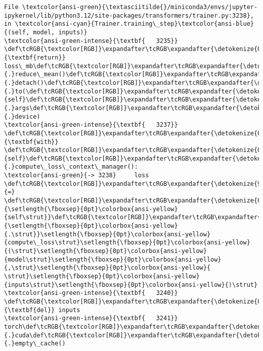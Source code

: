 \documentclass[11pt]{article}
\begin{document}
\begin{Verbatim}[commandchars=\\\{\}, frame=single, framerule=2mm, rulecolor=\color{outerrorbackground}]
File \textcolor{ansi-green}{\textasciitilde{}/miniconda3/envs/jupyter-ipykernel/lib/python3.12/site-packages/transformers/trainer.py:3238}, in \textcolor{ansi-cyan}{Trainer.training\_step}\textcolor{ansi-blue}{(self, model, inputs)}
\textcolor{ansi-green-intense}{\textbf{   3235}}     \def\tcRGB{\textcolor[RGB]}\expandafter\tcRGB\expandafter{\detokenize{0,135,0}}{\textbf{return}} loss\_mb\def\tcRGB{\textcolor[RGB]}\expandafter\tcRGB\expandafter{\detokenize{98,98,98}}{.}reduce\_mean()\def\tcRGB{\textcolor[RGB]}\expandafter\tcRGB\expandafter{\detokenize{98,98,98}}{.}detach()\def\tcRGB{\textcolor[RGB]}\expandafter\tcRGB\expandafter{\detokenize{98,98,98}}{.}to(\def\tcRGB{\textcolor[RGB]}\expandafter\tcRGB\expandafter{\detokenize{0,135,0}}{self}\def\tcRGB{\textcolor[RGB]}\expandafter\tcRGB\expandafter{\detokenize{98,98,98}}{.}args\def\tcRGB{\textcolor[RGB]}\expandafter\tcRGB\expandafter{\detokenize{98,98,98}}{.}device)
\textcolor{ansi-green-intense}{\textbf{   3237}} \def\tcRGB{\textcolor[RGB]}\expandafter\tcRGB\expandafter{\detokenize{0,135,0}}{\textbf{with}} \def\tcRGB{\textcolor[RGB]}\expandafter\tcRGB\expandafter{\detokenize{0,135,0}}{self}\def\tcRGB{\textcolor[RGB]}\expandafter\tcRGB\expandafter{\detokenize{98,98,98}}{.}compute\_loss\_context\_manager():
\textcolor{ansi-green}{-> 3238}     loss \def\tcRGB{\textcolor[RGB]}\expandafter\tcRGB\expandafter{\detokenize{98,98,98}}{=} \def\tcRGB{\textcolor[RGB]}\expandafter\tcRGB\expandafter{\detokenize{0,135,0}}{\setlength{\fboxsep}{0pt}\colorbox{ansi-yellow}{self\strut}}\def\tcRGB{\textcolor[RGB]}\expandafter\tcRGB\expandafter{\detokenize{98,98,98}}{\setlength{\fboxsep}{0pt}\colorbox{ansi-yellow}{.\strut}}\setlength{\fboxsep}{0pt}\colorbox{ansi-yellow}{compute\_loss\strut}\setlength{\fboxsep}{0pt}\colorbox{ansi-yellow}{(\strut}\setlength{\fboxsep}{0pt}\colorbox{ansi-yellow}{model\strut}\setlength{\fboxsep}{0pt}\colorbox{ansi-yellow}{,\strut}\setlength{\fboxsep}{0pt}\colorbox{ansi-yellow}{ \strut}\setlength{\fboxsep}{0pt}\colorbox{ansi-yellow}{inputs\strut}\setlength{\fboxsep}{0pt}\colorbox{ansi-yellow}{)\strut}
\textcolor{ansi-green-intense}{\textbf{   3240}} \def\tcRGB{\textcolor[RGB]}\expandafter\tcRGB\expandafter{\detokenize{0,135,0}}{\textbf{del}} inputs
\textcolor{ansi-green-intense}{\textbf{   3241}} torch\def\tcRGB{\textcolor[RGB]}\expandafter\tcRGB\expandafter{\detokenize{98,98,98}}{.}cuda\def\tcRGB{\textcolor[RGB]}\expandafter\tcRGB\expandafter{\detokenize{98,98,98}}{.}empty\_cache()


\end{Verbatim}
\end{document}
